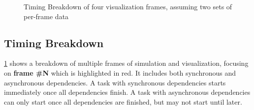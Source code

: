 \begin{figurepage}
\begin{figure}[p]
    \centering
    \caption{Timing Breakdown of four visualization frames, assuming two sets of per-frame data}
    \label{fig:DesignTiming}
\end{figure}
\end{figurepage}

\subsection{Timing Breakdown}\label{sec:Design:Viz:Timing}

\cref{fig:DesignTiming} shows a breakdown of multiple frames of simulation and visualization, focusing on \textbf{frame \#N} which is highlighted in red.
It includes both synchronous and asynchronous dependencies.
A task with synchronous dependencies starts immediately once all dependencies finish.
A task with asynchronous dependencies can only start once all dependencies are finished, but may not start until later.

